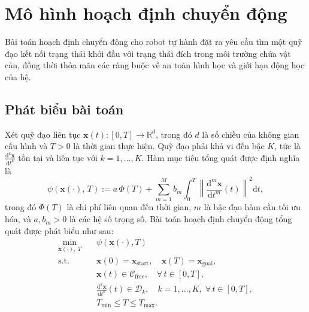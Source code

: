 \section{Mô hình hoạch định chuyển động}
\label{sec:motion_planning_model}

Bài toán hoạch định chuyển động cho robot tự hành đặt ra yêu cầu tìm một quỹ đạo
kết nối trạng thái khởi đầu với trạng thái đích trong môi trường chứa vật cản,
đồng thời thỏa mãn các ràng buộc về an toàn hình học và giới hạn động học của hệ.

\subsection{Phát biểu bài toán}
\label{subsec:planning_problem}

Xét quỹ đạo liên tục $\mathbf{x}(t) \colon [0, T] \to \mathbb{R}^d$, trong đó
$d$ là số chiều của không gian cấu hình và $T > 0$ là thời gian thực hiện.
Quỹ đạo phải khả vi đến bậc $K$, tức là
$\frac{\mathrm{d}^k \mathbf{x}}{\mathrm{d}t^k}$ tồn tại và liên tục với $k = 1, \ldots, K$.
Hàm mục tiêu tổng quát được định nghĩa là
\begin{equation}
    \psi(\mathbf{x}(\cdot),\, T)
    :=
    a\,\Phi(T)
    + \sum_{m=1}^{M} b_m
      \int_0^T
      \left\| \frac{\mathrm{d}^m \mathbf{x}}{\mathrm{d}t^m}(t) \right\|^2
      \mathrm{d}t,
    \label{eq:cost_general}
\end{equation}
trong đó $\Phi(T)$ là chi phí liên quan đến thời gian, $m$ là bậc đạo hàm cần
tối ưu hóa, và $a, b_m > 0$ là các hệ số trọng số.
Bài toán hoạch định chuyển động tổng quát được phát biểu như sau:
\begin{equation}
\begin{aligned}
    \min_{\mathbf{x}(\cdot),\; T} \quad
    & \psi(\mathbf{x}(\cdot), T) \\
    \mathrm{s.t.} \quad
    & \mathbf{x}(0) = \mathbf{x}_{\mathrm{start}},
      \quad
      \mathbf{x}(T) = \mathbf{x}_{\mathrm{goal}}, \\
    & \mathbf{x}(t) \in \mathcal{C}_{\mathrm{free}},
      \quad \forall\, t \in [0, T], \\
    & \frac{\mathrm{d}^k \mathbf{x}}{\mathrm{d}t^k}(t) \in \mathcal{D}_k,
      \quad k = 1, \ldots, K,\; \forall\, t \in [0, T], \\
    & T_{\min} \leq T \leq T_{\max}.
\end{aligned}
\label{eq:planning_problem}
\end{equation}

